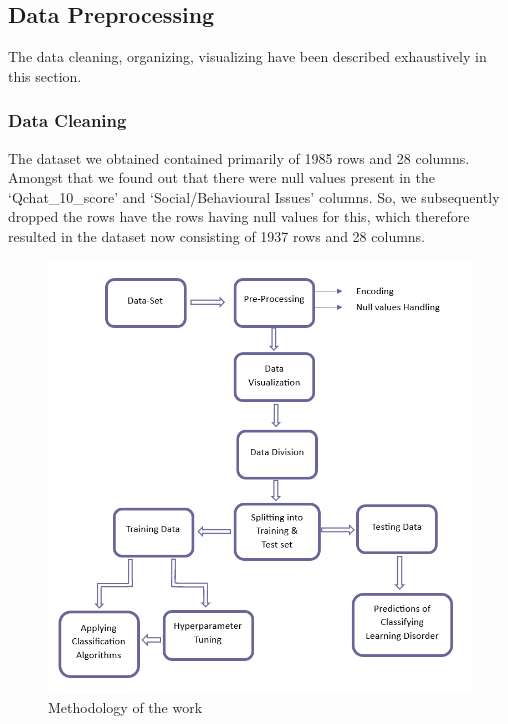 \documentclass{article}
\begin{document}
\begin{multicols}{2}
\subsection{Data Preprocessing}
\hspace*{\parindent}The data cleaning, organizing, visualizing have been described exhaustively in this section.

\subsubsection{Data Cleaning}
\hspace*{\parindent}The dataset we obtained contained primarily of 1985 rows and 28 columns. Amongst that we found out that there were null values present in the ‘Qchat\_10\_score’ and ‘Social/Behavioural Issues’ columns. So, we subsequently dropped the rows have the rows having null values for this, which therefore resulted in the dataset now consisting of 1937 rows and 28 columns.

\end{multicols}
    \noindent
    \begin{minipage}{\textwidth}
        \begin{figure}[H]
            \centering
            \includegraphics[width=1.05\textwidth]{images/map.png}
            \caption{Methodology of the work}
            \vspace{0.1em}
            \label{mapping}
        \end{figure}
    \end{minipage}
\end{document}
